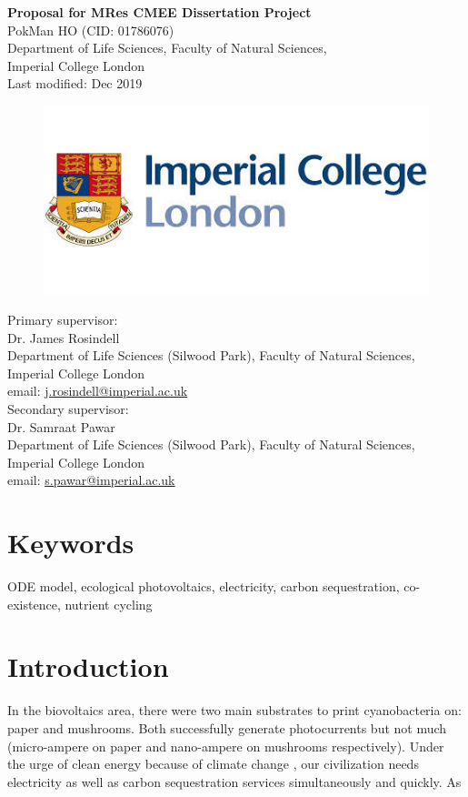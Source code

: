 \documentclass[a4paper, 11pt]{article}
\title{\ReportTitle}
\author{\ReportAuthor}
\date{}
\newcommand{\ReportTitle}{Proposal for MRes CMEE Dissertation Project}
\newcommand{\ReportAuthor}{PokMan HO (CID: 01786076)}
\newcommand{\ReportAffil}{Department of Life Sciences, Faculty of Natural Sciences,\\Imperial College London}
\begin{document}
	\begin{center}
		\Huge\textbf{\ReportTitle}\\
		\LARGE\ReportAuthor\\
		\Large\ReportAffil\\
		\Large{Last modified: Dec 2019}
	\end{center}
	\begin{figure}[h]
		\centering\includegraphics[width=\linewidth]{icl.jpg}
	\end{figure}
Primary supervisor:\\
\indent Dr. James Rosindell\\
\indent Department of Life Sciences (Silwood Park), Faculty of Natural Sciences, Imperial College London\\
\indent email: \href{mailto:j.rosindell@imperial.ac.uk}{j.rosindell@imperial.ac.uk}\\
Secondary supervisor:\\
\indent Dr. Samraat Pawar\\
\indent Department of Life Sciences (Silwood Park), Faculty of Natural Sciences, Imperial College London\\
\indent email: \href{mailto:s.pawar@imperial.ac.uk}{s.pawar@imperial.ac.uk}
\clearpage
\section{Keywords}
ODE model, ecological photovoltaics, electricity, carbon sequestration, co-existence, nutrient cycling
\section{Introduction}
In the biovoltaics area, there were two main substrates to print cyanobacteria on: paper\autocite{sawa2017electricity} and mushrooms\autocite{joshi2018bacterial}.  Both successfully generate photocurrents but not much (micro-ampere on paper \autocite{sawa2017electricity} and nano-ampere on mushrooms \autocite{joshi2018bacterial} respectively).  Under the urge of clean energy because of climate change \autocite{schuur2015climate}, our civilization needs electricity as well as carbon sequestration services simultaneously and quickly.  As 
\end{document}
